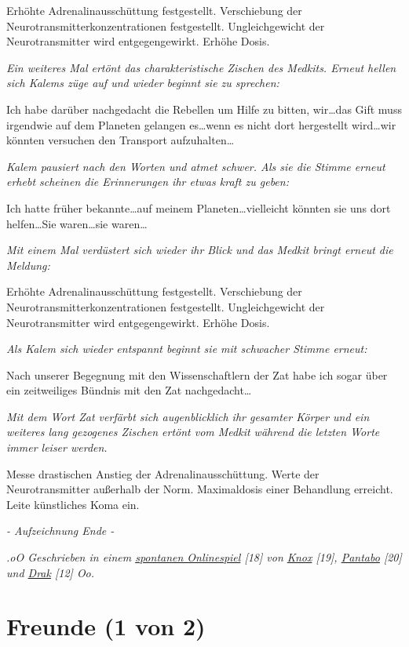 \documentclass[11pt]{scrartcl}
\begin{document}
Erhöhte Adrenalinausschüttung festgestellt. Verschiebung der
Neurotransmitterkonzentrationen festgestellt. Ungleichgewicht der
Neurotransmitter wird entgegengewirkt. Erhöhe Dosis.

\emph{Ein weiteres Mal ertönt das charakteristische Zischen des Medkits.
Erneut hellen sich Kalems züge auf und wieder beginnt sie zu sprechen:}

Ich habe darüber nachgedacht die Rebellen um Hilfe zu bitten,
wir\ldots{}das Gift muss irgendwie auf dem Planeten gelangen
es\ldots{}wenn es nicht dort hergestellt wird\ldots{}wir könnten
versuchen den Transport aufzuhalten\ldots{}

\emph{Kalem pausiert nach den Worten und atmet schwer. Als sie die
Stimme erneut erhebt scheinen die Erinnerungen ihr etwas kraft zu
geben:}

Ich hatte früher bekannte\ldots{}auf meinem Planeten\ldots{}vielleicht
könnten sie uns dort helfen\ldots{}Sie waren\ldots{}sie waren\ldots{}

\emph{Mit einem Mal verdüstert sich wieder ihr Blick und das Medkit
bringt erneut die Meldung:}

Erhöhte Adrenalinausschüttung festgestellt. Verschiebung der
Neurotransmitterkonzentrationen festgestellt. Ungleichgewicht der
Neurotransmitter wird entgegengewirkt. Erhöhe Dosis.

\emph{Als Kalem sich wieder entspannt beginnt sie mit schwacher Stimme
erneut:}

Nach unserer Begegnung mit den Wissenschaftlern der Zat habe ich sogar
über ein zeitweiliges Bündnis mit den Zat nachgedacht\ldots{}

\emph{Mit dem Wort Zat verfärbt sich augenblicklich ihr gesamter Körper
und ein weiteres lang gezogenes Zischen ertönt vom Medkit während die
letzten Worte immer leiser werden.}

Messe drastischen Anstieg der Adrenalinausschüttung. Werte der
Neurotransmitter außerhalb der Norm. Maximaldosis einer Behandlung
erreicht. Leite künstliches Koma ein.

\emph{- Aufzeichnung Ende -}

\emph{.oO Geschrieben in einem \href{}{spontanen Onlinespiel} {[}18{]}
von \href{http://1w6.org/uzanto/knox}{Knox} {[}19{]},
\href{http://1w6.org/uzanto/pantabo}{Pantabo} {[}20{]} und
\href{http://1w6.org/uzanto/drak}{Drak} {[}12{]} Oo.}

\section{Freunde (1 von 2)}
\end{document}
